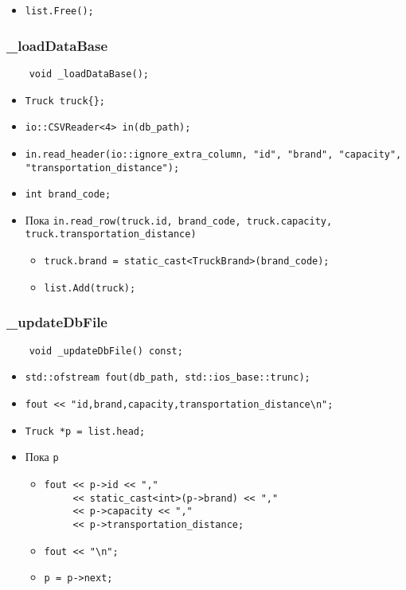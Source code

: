 \begin{itemize}
    \item \verb|list.Free();|
\end{itemize}

\subsubsection{\_loadDataBase}

\begin{lstlisting}
    void _loadDataBase();
\end{lstlisting}

\begin{itemize}
    \item \verb|Truck truck{};|
    \item \verb|io::CSVReader<4> in(db_path);|
    \item \verb|in.read_header(io::ignore_extra_column, "id", "brand", "capacity", "transportation_distance");|
    \item \verb|int brand_code;|
    \item Пока \verb|in.read_row(truck.id, brand_code, truck.capacity, truck.transportation_distance)|
        \begin{itemize}
            \item \verb|truck.brand = static_cast<TruckBrand>(brand_code);|
            \item \verb|list.Add(truck);|
        \end{itemize}
\end{itemize}

\subsubsection{\_updateDbFile}

\begin{lstlisting}
    void _updateDbFile() const;
\end{lstlisting}

\begin{itemize}
    \item \verb|std::ofstream fout(db_path, std::ios_base::trunc);|
    \item \verb|fout << "id,brand,capacity,transportation_distance\n";|
    \item \verb|Truck *p = list.head;|
    \item Пока \verb|p|
        \begin{itemize}
            \item 
            \verb|fout << p->id << ","|\\
            \verb|     << static_cast<int>(p->brand) << ","|\\
            \verb|     << p->capacity << ","|\\
            \verb|     << p->transportation_distance;|
            \item \verb|fout << "\n";|
            \item \verb|p = p->next;|
        \end{itemize}
\end{itemize}

